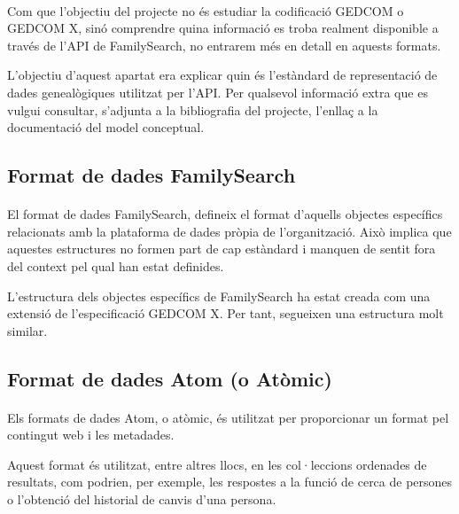          \paragraph{}
         Com que l’objectiu del projecte no és estudiar la codificació GEDCOM o GEDCOM X, sinó comprendre quina informació es troba realment disponible a través de l'API de FamilySearch, no entrarem més en detall en aquests formats.

         L’objectiu d’aquest apartat era explicar quin és l'estàndard de representació de dades genealògiques utilitzat per l'API. Per qualsevol informació extra que es vulgui consultar, s’adjunta a la bibliografia del projecte, l’enllaç a la documentació del model conceptual.


     \subsection{Format de dades FamilySearch}

        \paragraph{}
        El format de dades FamilySearch, defineix el format d'aquells objectes específics relacionats amb la plataforma de dades pròpia de l'organització. Això implica que aquestes estructures no formen part de cap estàndard i manquen de sentit fora del context pel qual han estat definides.

        L'estructura dels objectes específics de FamilySearch ha estat creada com una extensió de l'especificació GEDCOM X. Per tant, segueixen una estructura molt similar.


    \subsection{Format de dades Atom (o Atòmic)}

        \paragraph{}
        Els formats de dades Atom, o atòmic, és utilitzat per proporcionar un format pel contingut web i les metadades.

        Aquest format és utilitzat, entre altres llocs, en les col·leccions ordenades de resultats, com podrien, per exemple, les respostes a la funció de cerca de persones o l'obtenció del historial de canvis d’una persona.


